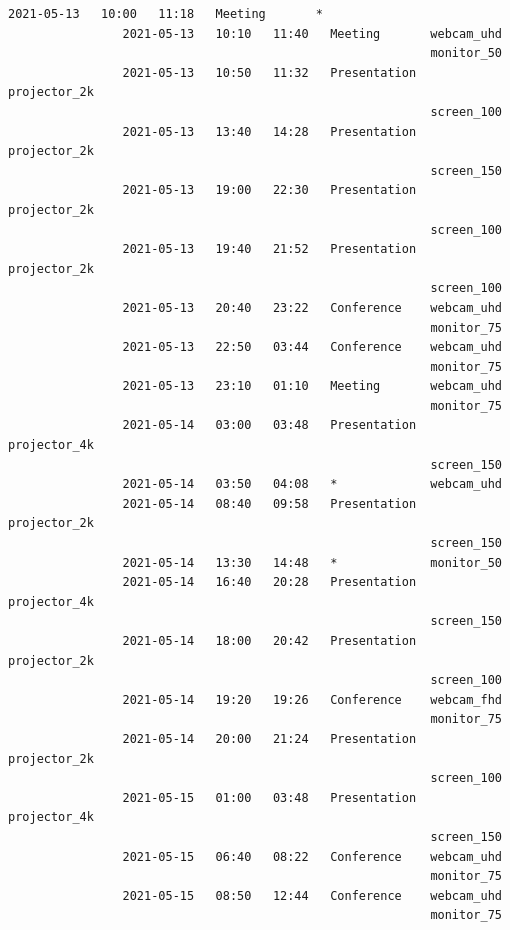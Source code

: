 \documentclass{article}
\begin{document}
\begin{Verbatim}[gobble=8]
                2021-05-13   10:00   11:18   Meeting       *
                2021-05-13   10:10   11:40   Meeting       webcam_uhd
                                                           monitor_50
                2021-05-13   10:50   11:32   Presentation  projector_2k
                                                           screen_100
                2021-05-13   13:40   14:28   Presentation  projector_2k
                                                           screen_150
                2021-05-13   19:00   22:30   Presentation  projector_2k
                                                           screen_100
                2021-05-13   19:40   21:52   Presentation  projector_2k
                                                           screen_100
                2021-05-13   20:40   23:22   Conference    webcam_uhd
                                                           monitor_75
                2021-05-13   22:50   03:44   Conference    webcam_uhd
                                                           monitor_75
                2021-05-13   23:10   01:10   Meeting       webcam_uhd
                                                           monitor_75
                2021-05-14   03:00   03:48   Presentation  projector_4k
                                                           screen_150
                2021-05-14   03:50   04:08   *             webcam_uhd
                2021-05-14   08:40   09:58   Presentation  projector_2k
                                                           screen_150
                2021-05-14   13:30   14:48   *             monitor_50
                2021-05-14   16:40   20:28   Presentation  projector_4k
                                                           screen_150
                2021-05-14   18:00   20:42   Presentation  projector_2k
                                                           screen_100
                2021-05-14   19:20   19:26   Conference    webcam_fhd
                                                           monitor_75
                2021-05-14   20:00   21:24   Presentation  projector_2k
                                                           screen_100
                2021-05-15   01:00   03:48   Presentation  projector_4k
                                                           screen_150
                2021-05-15   06:40   08:22   Conference    webcam_uhd
                                                           monitor_75
                2021-05-15   08:50   12:44   Conference    webcam_uhd
                                                           monitor_75

\end{Verbatim}
\end{document}
